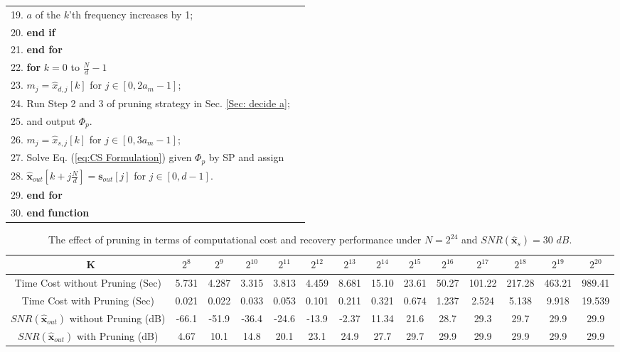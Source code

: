\documentclass[journal,onecolumn,11pt]{IEEEtran}
\begin{document}
\begin{algorithm}[h]
\begin{tabular}[t]{p{17.7cm}l}
19. \quad \quad \quad $a$ of the $k$'th frequency increases by 1;\\
20. \quad \quad \textbf{end if}\\
21. \quad \textbf{end for} \\
22. \quad \textbf{for} $k = 0$ to $  \frac{N}{d}-1$\\
23. \quad \quad $m_{j}= \hat{x}_{d,j}[k]$ for $j \in [0,2a_{m}-1]$; \\
24. \quad \quad Run Step 2 and 3 of pruning strategy in Sec. \ref{Sec: decide a};\\
25. \quad \quad and output $\Phi_{p}$.\\
26. \quad \quad $m_{j}= \hat{x}_{s,j}[k]$ for $j \in [0,3a_{m}-1]$; \\
27. \quad \quad Solve Eq. (\ref{eq:CS Formulation}) given $\Phi_{p}$ by SP and assign  \\
28. \quad \quad $\bm{\hat{x}}_{out}[k+j\frac{N}{d}]=$$\bm{s}_{out}[j]$ for $j \in [0,d-1]$. \\
29. \quad \textbf{end for} \\
30. \textbf{end} \textbf{function}\\
\hline
\end{tabular}
\end{algorithm}
\renewcommand\arraystretch{1}

\begin{table}[t]
\fontsize{7.5pt}{1em}\selectfont
\centering
\setlength{\abovecaptionskip}{0pt}
\setlength{\belowcaptionskip}{4pt}
\caption{The effect of pruning in terms of computational cost and recovery performance under $N=2^{24}$ and $SNR(\bm{\hat{x}}_{s})=30$ $dB$.}
\label{Table: pruning comparision}
\doublerulesep=2pt
\begin{tabular}[tc]{|c|c|c|c|c|c|c|c|c|c|c|c|c|c|}
\hline
{\LARGE \textcolor{white}{o}}K& $2^{8}$& $2^{9}$& $2^{10}$ & $2^{11}$& $2^{12}$ & $2^{13}$ & $2^{14}$ & $2^{15}$ & $2^{16}$ & $2^{17}$ & $2^{18}$ & $2^{19}$ & $2^{20}$ \\ \hline
Time Cost without Pruning (Sec)& 5.731& 4.287& 3.315 & 3.813 & 4.459 & 8.681 & 15.10 & 23.61 & 50.27 & 101.22 & 217.28 & 463.21 & 989.41  \\ \hline
Time Cost with Pruning (Sec)& 0.021&  0.022 & 0.033 & 0.053 & 0.101 & 0.211 & 0.321 & 0.674 & 1.237 & 2.524 & 5.138 & 9.918 &19.539 \\ \hline
$SNR(\bm{\hat{x}}_{out})$ without Pruning (dB)& -66.1& -51.9& -36.4 & -24.6 & -13.9 & -2.37 & 11.34 & 21.6 & 28.7 & 29.3 & 29.7 & 29.9 & 29.9 \\ \hline
$SNR(\bm{\hat{x}}_{out})$  with Pruning (dB)& 4.67& 10.1& 14.8 & 20.1 & 23.1 & 24.9 & 27.7 & 29.7 & 29.9 & 29.9 & 29.9 & 29.9 & 29.9 \\ \hline
\end{tabular}
\end{table}
\end{document}
